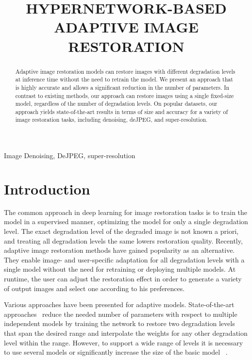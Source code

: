 \documentclass{article}
\title{HYPERNETWORK-BASED ADAPTIVE IMAGE RESTORATION}
\begin{document}
\maketitle
\begin{abstract}
Adaptive image restoration models can restore images with different degradation levels at inference time without the need to retrain the model. We present an approach that is highly accurate and allows a significant reduction in the number of parameters. In contrast to existing methods, our approach can restore images using a single fixed-size model, regardless of the number of degradation levels. On popular datasets, our approach yields state-of-the-art results in terms of size and accuracy for a variety of image restoration tasks, including denoising, deJPEG, and super-resolution.
\end{abstract}
\begin{keywords}
Image Denoising, DeJPEG, super-resolution
\end{keywords}
\section{Introduction}
\label{sec:intro}
The common approach in deep learning for image restoration tasks is to train the model in a supervised manner, optimizing the model for only a single degradation level. The exact degradation level of the degraded image is not known a priori, and treating all degradation levels the same lowers restoration quality. Recently, adaptive image restoration methods have gained popularity as an alternative. They enable image- and user-specific adaptation for all degradation levels with a single model without the need for retraining or deploying multiple models. At runtime, the user can adjust the restoration effect in order to generate a variety of output images and select one according to his preferences.

Various approaches have been presented for adaptive models. State-of-the-art approaches~\cite{He_2019_CVPR,dnInterpolation,dynamicnet,wang2019cfsnet} reduce the needed number of parameters with respect to multiple independent models by training the network to restore two degradation levels that span the desired range and interpolate the weights for any other degradation level within the range. However, to support a wide range of levels it is necessary to use several models or significantly increase the size of the basic model ~\cite{cresmd}. 
\end{document}
